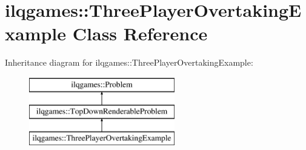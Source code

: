 \hypertarget{classilqgames_1_1_three_player_overtaking_example}{}\section{ilqgames\+:\+:Three\+Player\+Overtaking\+Example Class Reference}
\label{classilqgames_1_1_three_player_overtaking_example}
Inheritance diagram for ilqgames\+:\+:Three\+Player\+Overtaking\+Example\+:\begin{figure}[H]
\begin{center}
\leavevmode
\includegraphics[height=3.000000cm]{classilqgames_1_1_three_player_overtaking_example}
\end{center}
\end{figure}
